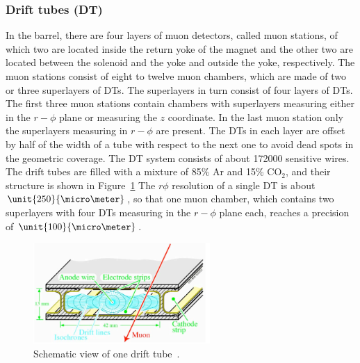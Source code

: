 \subsubsection*{Drift tubes (DT)}
In the barrel, there are four layers of muon detectors, called muon stations, of which two are located inside the return yoke of the magnet and the other two are located between the solenoid and the yoke and outside the yoke, respectively. The muon stations consist of eight to twelve muon chambers, which are made of two or three superlayers of DTs. The superlayers in turn consist of four layers of DTs. The first three muon stations contain chambers with superlayers measuring either in the $r-\phi$ plane or measuring the $z$ coordinate. In the last muon station only the superlayers measuring in $r-\phi$ are present. The DTs in each layer are offset by half of the width of a tube with respect to the next one to avoid dead spots in the geometric coverage. The DT system consists of about 172000 sensitive wires. The drift tubes are filled with a mixture of 85\% Ar and 15\% $\text{CO}_2$, and their structure is shown in Figure~\ref{fig:DT} The $r\phi$ resolution of a single DT is about $\unit{250}{\micro\meter}$, so that one muon chamber, which contains two superlayers with four DTs measuring in the $r-\phi$ plane each, reaches a precision of $\unit{100}{\micro\meter}$.
\begin{figure}[htbp]
\centering
  \includegraphics[width=0.6\textwidth]{plots/CMS/DT.png}
\caption{Schematic view of one drift tube~\cite{CMS}.}
\label{fig:DT}
\end{figure}  
